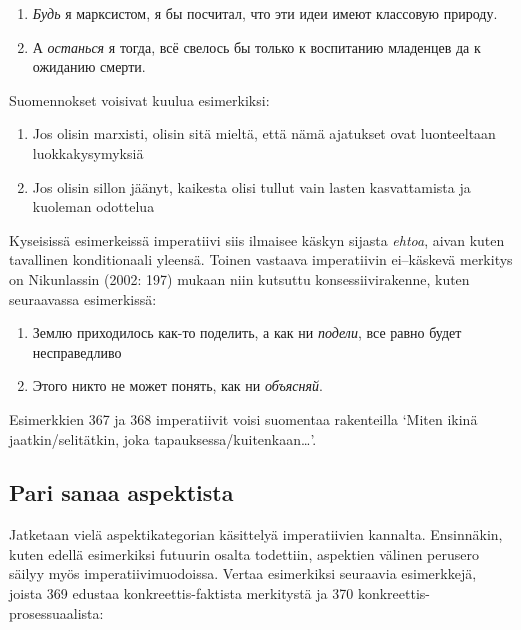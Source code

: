 \documentclass[]{scrreprt}
\providecommand{\tightlist}{%
  \setlength{\itemsep}{0pt}\setlength{\parskip}{0pt}}
\begin{document}
\begin{enumerate}
\def\labelenumi{(\arabic{enumi})}
\setcounter{enumi}{362}
\tightlist
\item
  \emph{Будь} я марксистом, я бы посчитал, что эти идеи имеют классовую
  природу.
\item
  А \emph{останься} я тогда, всё свелось бы только к воспитанию
  младенцев да к ожиданию смерти.
\end{enumerate}

Suomennokset voisivat kuulua esimerkiksi:

\begin{enumerate}
\def\labelenumi{(\arabic{enumi})}
\setcounter{enumi}{364}
\tightlist
\item
  Jos olisin marxisti, olisin sitä mieltä, että nämä ajatukset ovat
  luonteeltaan luokkakysymyksiä
\item
  Jos olisin sillon jäänyt, kaikesta olisi tullut vain lasten
  kasvattamista ja kuoleman odottelua
\end{enumerate}

Kyseisissä esimerkeissä imperatiivi siis ilmaisee käskyn sijasta
\emph{ehtoa}, aivan kuten tavallinen konditionaali yleensä. Toinen
vastaava imperatiivin ei--käskevä merkitys on Nikunlassin (2002: 197)
mukaan niin kutsuttu konsessiivirakenne, kuten seuraavassa esimerkissä:

\begin{enumerate}
\def\labelenumi{(\arabic{enumi})}
\setcounter{enumi}{366}
\tightlist
\item
  Землю приходилось как-то поделить, а как ни \emph{подели}, все равно
  будет несправедливо
\item
  Этого никто не может понять, как ни \emph{объясняй}.
\end{enumerate}

Esimerkkien 367 ja 368 imperatiivit voisi suomentaa rakenteilla `Miten
ikinä jaatkin/selitätkin, joka tapauksessa/kuitenkaan\ldots{}'.

\subsection{Pari sanaa aspektista}\label{pari-sanaa-aspektista}

Jatketaan vielä aspektikategorian käsittelyä imperatiivien kannalta.
Ensinnäkin, kuten edellä esimerkiksi futuurin osalta todettiin,
aspektien välinen perusero säilyy myös imperatiivimuodoissa. Vertaa
esimerkiksi seuraavia esimerkkejä, joista 369 edustaa
konkreettis-faktista merkitystä ja 370 konkreettis-prosessuaalista:
\end{document}
